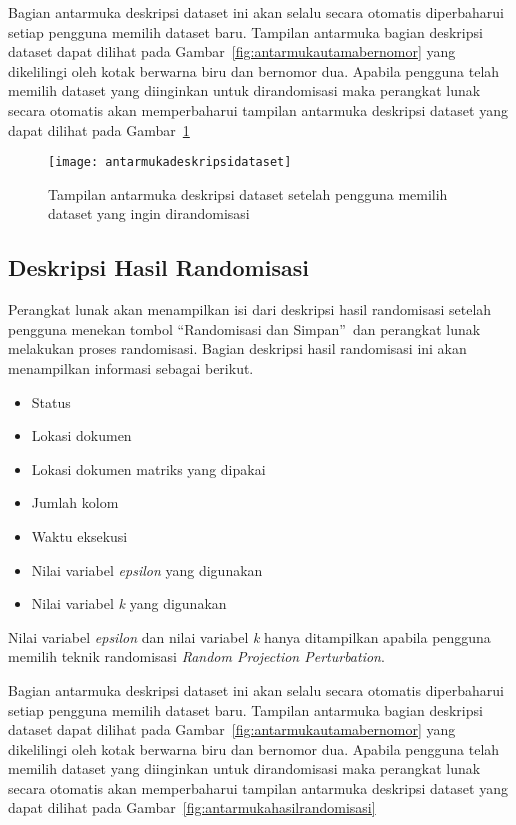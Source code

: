 Bagian antarmuka deskripsi dataset ini akan selalu secara otomatis diperbaharui setiap pengguna memilih dataset baru. Tampilan antarmuka bagian deskripsi dataset dapat dilihat pada Gambar~\ref{fig:antarmukautamabernomor} yang dikelilingi oleh kotak berwarna biru dan bernomor dua. Apabila pengguna telah memilih dataset yang diinginkan untuk dirandomisasi maka perangkat lunak secara otomatis akan memperbaharui tampilan antarmuka deskripsi dataset yang dapat dilihat pada Gambar~\ref{fig:antarmukadeskripsidataset}

\begin{figure}
	\centering
	\texttt{[image: antarmukadeskripsidataset]}
	\caption{Tampilan antarmuka deskripsi dataset setelah pengguna memilih dataset yang ingin dirandomisasi}
	\label{fig:antarmukadeskripsidataset}
\end{figure}

\subsection{Deskripsi Hasil Randomisasi}
\label{subsec:masukanpengaturan}

Perangkat lunak akan menampilkan isi dari deskripsi hasil randomisasi setelah pengguna menekan tombol \textquotedblleft Randomisasi dan Simpan\textquotedblright~dan perangkat lunak melakukan proses randomisasi. Bagian deskripsi hasil randomisasi ini akan menampilkan informasi sebagai berikut. 
\begin{itemize}
	\item Status
	\item Lokasi dokumen
	\item Lokasi dokumen matriks yang dipakai
	\item Jumlah kolom
	\item Waktu eksekusi
	\item Nilai variabel \textit{epsilon} yang digunakan
	\item Nilai variabel \textit{k} yang digunakan
\end{itemize}
Nilai variabel \textit{epsilon} dan nilai variabel \textit{k} hanya ditampilkan apabila pengguna memilih teknik randomisasi \textit{Random Projection Perturbation}.

Bagian antarmuka deskripsi dataset ini akan selalu secara otomatis diperbaharui setiap pengguna memilih dataset baru. Tampilan antarmuka bagian deskripsi dataset dapat dilihat pada Gambar~\ref{fig:antarmukautamabernomor} yang dikelilingi oleh kotak berwarna biru dan bernomor dua. Apabila pengguna telah memilih dataset yang diinginkan untuk dirandomisasi maka perangkat lunak secara otomatis akan memperbaharui tampilan antarmuka deskripsi dataset yang dapat dilihat pada Gambar~\ref{fig:antarmukahasilrandomisasi}

